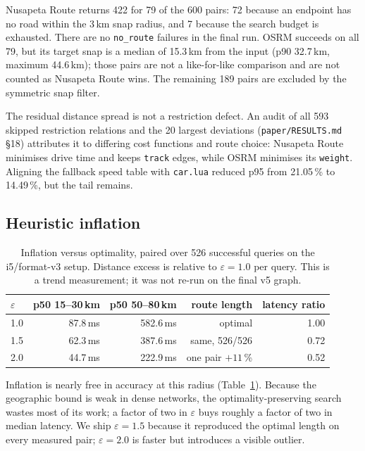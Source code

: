 \documentclass[sigconf,nonacm]{acmart}
\begin{document}
Nusapeta Route returns 422 for 79 of the 600 pairs: 72 because an endpoint has no road
within the 3\,km snap radius, and 7 because the search budget is exhausted. There
are no \texttt{no\_route} failures in the final run. OSRM succeeds on all 79, but
its target snap is a median of 15.3\,km from the input (p90 32.7\,km, maximum
44.6\,km); those pairs are not a like-for-like comparison and are not counted as
Nusapeta Route wins. The remaining 189 pairs are excluded by the symmetric snap filter.

The residual distance spread is not a restriction defect. An audit of all 593
skipped restriction relations and the 20 largest deviations
(\texttt{paper/RESULTS.md}\,\S18) attributes it to differing cost functions and
route choice: Nusapeta Route minimises drive time and keeps \texttt{track} edges, while
OSRM minimises its \texttt{weight}. Aligning the fallback speed table with
\texttt{car.lua} reduced p95 from 21.05\,\% to 14.49\,\%, but the tail remains.

\subsection{Heuristic inflation}
\begin{table}[t]
\footnotesize
\begin{tabular}{@{}lrrrr@{}}
\toprule
$\varepsilon$ & p50 15--30\,km & p50 50--80\,km & route length & latency ratio \\
\midrule
1.0 &  87.8\,ms & 582.6\,ms & optimal & 1.00 \\
1.5 &  62.3\,ms & 387.6\,ms & same, 526/526 & 0.72 \\
2.0 &  44.7\,ms & 222.9\,ms & one pair $+11$\,\% & 0.52 \\
\bottomrule
\end{tabular}
\caption{Inflation versus optimality, paired over 526 successful queries on the
i5/format-v3 setup. Distance excess is relative to $\varepsilon=1.0$ per query.
This is a trend measurement; it was not re-run on the final v5 graph.}
\label{tab:eps}
\end{table}

Inflation is nearly free in accuracy at this radius (Table~\ref{tab:eps}). Because
the geographic bound is weak in dense networks, the optimality-preserving search
wastes most of its work; a factor of two in $\varepsilon$ buys roughly a factor of
two in median latency. We ship $\varepsilon=1.5$ because it reproduced the optimal
length on every measured pair; $\varepsilon=2.0$ is faster but introduces a
visible outlier.
\end{document}
